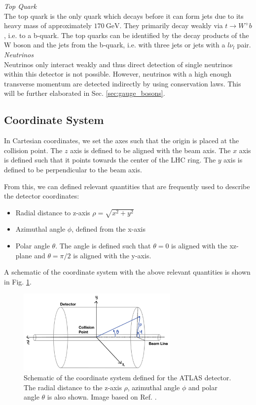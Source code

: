 \documentclass[a4paper]{report}
\numberwithin{equation}{section}
\begin{document}
\noindent \textit{Top Quark} \\

The top quark is the only quark which decays before it can form jets due to its heavy mass of approximately $\SI{170}{\giga\electronvolt}$. They 
primarily decay weakly via $t \rightarrow W^+ b$, i.e. to a b-quark. The top quarks can be identified by the decay products of the W boson and the 
jets from the b-quark, i.e. with three jets or jets with a $l\nu_l$ pair. \\

\noindent \textit{Neutrinos} \\

Neutrinos only interact weakly and thus direct detection of single neutrinos within this detector is not possible. However, neutrinos with a high enough 
transverse momentum are detected indirectly by using conservation laws. This will be further elaborated in Sec. \ref{sec:gauge_bosons}.

\subsection{Coordinate System} 

In Cartesian coordinates, we set the axes such that the origin is placed at the collision point. 
The $z$ axis is defined to be aligned with the beam axis. The $x$ axis is defined such that it 
points towards the center of the LHC ring. The $y$ axis is defined to be perpendicular to the beam axis. 
\par

From this, we can defined relevant quantities that are frequently used to describe the detector coordinates:
\begin{itemize}
	\item Radial distance to z-axis $\rho = \sqrt{x^2 + y^2}$ 
	\item Azimuthal angle $\phi$, defined from the x-axis 
	\item Polar angle $\theta$. The angle is defined such that $\theta = 0$ is aligned with the xz-plane and $\theta = \pi / 2$ is 
			aligned with the y-axis. 
\end{itemize}
A schematic of the coordinate system with the above relevant quantities is shown in Fig. \ref{fig:atlas_coord}.

\begin{figure}[htpb]
    \centering
    \includegraphics[width=0.7\textwidth]{atlas_coords.png}
    \caption{Schematic of the coordinate system defined for the ATLAS detector. The radial distance to the z-axis $\rho$, 
	azimuthal angle $\phi$ and polar angle $\theta$ is also shown. Image based on Ref. \cite{Rivera2018}.}
    \label{fig:atlas_coord}
\end{figure}
\end{document}
